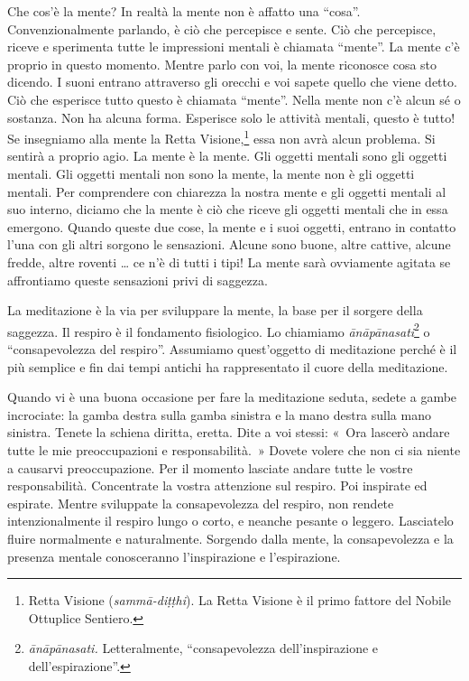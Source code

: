 Che cos'è la mente? In realtà la mente non è affatto una ``cosa''.
Convenzionalmente parlando, è ciò che percepisce e sente. Ciò che
percepisce, riceve e sperimenta tutte le impressioni mentali è chiamata
``mente''. La mente c'è proprio in questo momento. Mentre parlo con voi,
la mente riconosce cosa sto dicendo. I suoni entrano attraverso gli
orecchi e voi sapete quello che viene detto. Ciò che esperisce tutto
questo è chiamata ``mente''. Nella mente non c'è alcun sé o sostanza.
Non ha alcuna forma. Esperisce solo le attività mentali, questo è tutto!
Se insegniamo alla mente la Retta Visione,\footnote{Retta Visione
  (\emph{sammā-diṭṭhi}). La Retta Visione è il primo fattore del Nobile
  Ottuplice Sentiero.} essa non avrà alcun problema. Si sentirà a
proprio agio. La mente è la mente. Gli oggetti mentali sono gli oggetti
mentali. Gli oggetti mentali non sono la mente, la mente non è gli
oggetti mentali. Per comprendere con chiarezza la nostra mente e gli
oggetti mentali al suo interno, diciamo che la mente è ciò che riceve
gli oggetti mentali che in essa emergono. Quando queste due cose, la
mente e i suoi oggetti, entrano in contatto l'una con gli altri sorgono
le sensazioni. Alcune sono buone, altre cattive, alcune fredde, altre
roventi \ldots{} ce n'è di tutti i tipi! La mente sarà ovviamente agitata se
affrontiamo queste sensazioni privi di saggezza.

La meditazione è la via per sviluppare la mente, la base per il sorgere
della saggezza. Il respiro è il fondamento fisiologico. Lo chiamiamo
\emph{ānāpānasati}\footnote{\emph{ānāpānasati.} Letteralmente,
  ``consapevolezza dell'inspirazione e dell'espirazione''.} o
``consapevolezza del respiro''. Assumiamo quest'oggetto di meditazione
perché è il più semplice e fin dai tempi antichi ha rappresentato il
cuore della meditazione.

Quando vi è una buona occasione per fare la meditazione seduta, sedete a
gambe incrociate: la gamba destra sulla gamba sinistra e la mano destra
sulla mano sinistra. Tenete la schiena diritta, eretta. Dite a voi
stessi: «~Ora lascerò andare tutte le mie preoccupazioni e
responsabilità.~» Dovete volere che non ci sia niente a causarvi
preoccupazione. Per il momento lasciate andare tutte le vostre
responsabilità. Concentrate la vostra attenzione sul respiro. Poi
inspirate ed espirate. Mentre sviluppate la consapevolezza del respiro,
non rendete intenzionalmente il respiro lungo o corto, e neanche pesante
o leggero. Lasciatelo fluire normalmente e naturalmente. Sorgendo dalla
mente, la consapevolezza e la presenza mentale conosceranno
l'inspirazione e l'espirazione.


